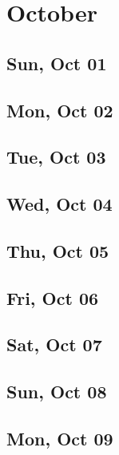 \chapter{October}
	\section{Sun, Oct 01}
		
	\section{Mon, Oct 02}
		
	\section{Tue, Oct 03}
		
	\section{Wed, Oct 04}
		
	\section{Thu, Oct 05}
		
	\section{Fri, Oct 06}
		
	\section{Sat, Oct 07}
		
	\section{Sun, Oct 08}
		
	\section{Mon, Oct 09}
		
